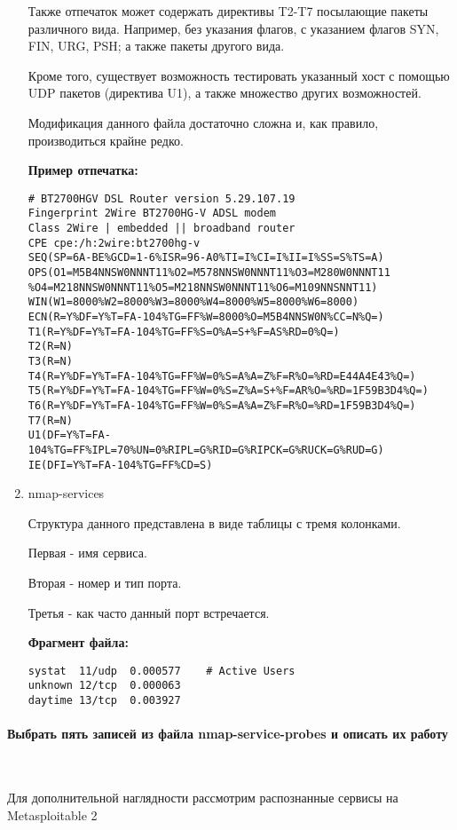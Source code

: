 \documentclass{article}
\begin{document}
\begin{enumerate}
Также отпечаток может содержать директивы T2-T7 посылающие пакеты различного вида. Например, без указания флагов, с указанием флагов SYN, FIN, URG, PSH; а также пакеты другого вида. 

Кроме того, существует возможность тестировать указанный хост с помощью UDP пакетов (директива U1), а также множество других возможностей.

Модификация данного файла достаточно сложна и, как правило, производиться крайне редко.

\textbf{Пример отпечатка:}
\begin{verbatim}
# BT2700HGV DSL Router version 5.29.107.19
Fingerprint 2Wire BT2700HG-V ADSL modem
Class 2Wire | embedded || broadband router
CPE cpe:/h:2wire:bt2700hg-v
SEQ(SP=6A-BE%GCD=1-6%ISR=96-A0%TI=I%CI=I%II=I%SS=S%TS=A)
OPS(O1=M5B4NNSW0NNNT11%O2=M578NNSW0NNNT11%O3=M280W0NNNT11
%O4=M218NNSW0NNNT11%O5=M218NNSW0NNNT11%O6=M109NNSNNT11)
WIN(W1=8000%W2=8000%W3=8000%W4=8000%W5=8000%W6=8000)
ECN(R=Y%DF=Y%T=FA-104%TG=FF%W=8000%O=M5B4NNSW0N%CC=N%Q=)
T1(R=Y%DF=Y%T=FA-104%TG=FF%S=O%A=S+%F=AS%RD=0%Q=)
T2(R=N)
T3(R=N)
T4(R=Y%DF=Y%T=FA-104%TG=FF%W=0%S=A%A=Z%F=R%O=%RD=E44A4E43%Q=)
T5(R=Y%DF=Y%T=FA-104%TG=FF%W=0%S=Z%A=S+%F=AR%O=%RD=1F59B3D4%Q=)
T6(R=Y%DF=Y%T=FA-104%TG=FF%W=0%S=A%A=Z%F=R%O=%RD=1F59B3D4%Q=)
T7(R=N)
U1(DF=Y%T=FA-104%TG=FF%IPL=70%UN=0%RIPL=G%RID=G%RIPCK=G%RUCK=G%RUD=G)
IE(DFI=Y%T=FA-104%TG=FF%CD=S)
\end{verbatim}

\item nmap-services

Структура данного представлена в виде таблицы с тремя колонками.

Первая - имя сервиса.

Вторая - номер и тип порта.

Третья - как часто данный порт встречается.

\textbf{Фрагмент файла:}
\begin{verbatim}
systat	11/udp	0.000577	# Active Users
unknown	12/tcp	0.000063
daytime	13/tcp	0.003927
\end{verbatim}

\end{enumerate}

\paragraph{Выбрать пять записей из файла nmap-service-probes и описать их работу}
~

Для дополнительной наглядности рассмотрим распознанные сервисы на Metasploitable 2
\end{document}
